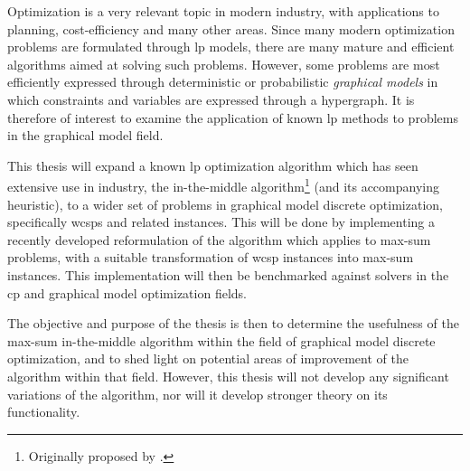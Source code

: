 Optimization is a very relevant topic in modern industry, with applications to planning, cost-efficiency and many other areas.
Since many modern optimization problems are formulated through \gls{lp} models, there are many mature and efficient algorithms aimed at solving such problems.
However, some problems are most efficiently expressed through deterministic or probabilistic \emph{graphical models} in which constraints and variables are expressed through a hypergraph.
It is therefore of interest to examine the application of known \gls{lp} methods to problems in the graphical model field.

This thesis will expand a known \gls{lp} optimization algorithm which has seen extensive use in industry, the in-the-middle algorithm\footnote{Originally proposed by \textcite{Wedelin95}.} (and its accompanying heuristic), to a wider set of problems in graphical model discrete optimization, specifically \glspl{wcsp} and related instances.
This will be done by implementing a recently developed reformulation of the algorithm which applies to max-sum problems, with a suitable transformation of \gls{wcsp} instances into max-sum instances.
This implementation will then be benchmarked against solvers in the \gls{cp} and graphical model optimization fields.

The objective and purpose of the thesis is then to determine the usefulness of the max-sum in-the-middle algorithm within the field of graphical model discrete optimization, and to shed light on potential areas of improvement of the algorithm within that field.
However, this thesis will not develop any significant variations of the algorithm, nor will it develop stronger theory on its functionality.
